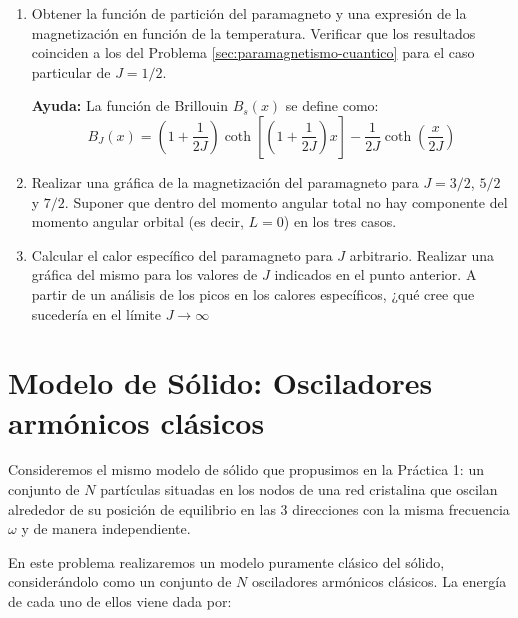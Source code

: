 \documentclass[a4paper,11pt]{article}
\begin{document}
\begin{enumerate}[label=(\alph*),
                  leftmargin=2\parindent,
                  rightmargin=2\parindent]

    \item{Obtener la función de partición del paramagneto y una
          expresión de la magnetización en función de la temperatura.
          Verificar que los resultados coinciden a los del Problema
          \ref{sec:paramagnetismo-cuantico} para el caso particular de
          $J=1/2$.}

    {\small
    \textbf{Ayuda:} La función de Brillouin $B_s(x)$ se define como:
    $$ B_J(x)  = \left( 1 + \frac{1}{2J} \right)
    \coth \left[ \left( 1 + \frac{1}{2J} \right)x \right] -
    \frac{1}{2J} \coth \left( \frac{x}{2J} \right) $$
    }

    \item{Realizar una gráfica de la magnetización del paramagneto
          para $J = 3/2$, $5/2$ y $7/2$. Suponer que dentro del momento
          angular total no hay componente del momento angular orbital
          (es decir, $L=0$) en los tres casos.}

    \item{Calcular el calor específico del paramagneto para $J$
          arbitrario. Realizar una gráfica del mismo para los valores de $J$
          indicados en el punto anterior.
          A partir de un análisis de los picos en los calores
          específicos, ¿qué cree que sucedería en el límite
          $J \rightarrow \infty$}

\end{enumerate}



\section{Modelo de Sólido: Osciladores armónicos clásicos}
\label{sec:oscilador-clasico}

Consideremos el mismo modelo de sólido que propusimos en la Práctica 1:
un conjunto de $N$ partículas situadas en los nodos de una red
cristalina que oscilan alrededor de su posición de equilibrio en las 3
direcciones con la misma frecuencia $\omega$ y de manera independiente.

En este problema realizaremos un modelo puramente clásico del sólido,
considerándolo como un conjunto de $N$ osciladores armónicos clásicos.
La energía de cada uno de ellos viene dada por:
\end{document}
